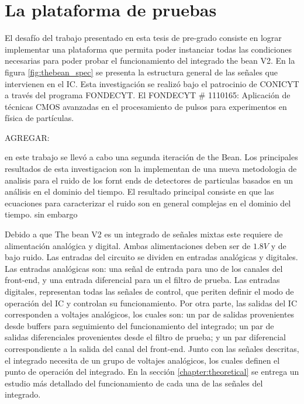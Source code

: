 \section{La plataforma de pruebas}
El desafío del trabajo presentado en esta tesis de pre-grado consiste en lograr implementar una plataforma que permita poder instanciar todas las condiciones necesarias para poder probar el funcionamiento del integrado the bean V2. En la figura \ref{fig:thebean_spec} se presenta la estructura general de las señales que intervienen en el IC.
Esta investigación se realizó bajo el patrocinio de CONICYT a través del programa FONDECYT.
El FONDECYT  \# 1110165: Aplicación de técnicas CMOS avanzadas en el procesamiento de pulsos para experimentos en física de partículas.

AGREGAR:

en este trabajo se llevó a cabo una segunda iteración de the Bean. Los principales resultados de esta investigacion son la implementan de una nueva metodologia de analisis para el ruido de los fornt ends de detectores de particulas basados en un análisis en el dominio del tiempo. El resultado principal consiste en que las ecuaciones para caracterizar el ruido son en general complejas en el dominio del tiempo. sin embargo 





Debido a que The bean V2 es un integrado de señales mixtas este requiere de alimentación analógica y digital. Ambas alimentaciones deben ser de $1.8V$ y de bajo ruido. Las entradas del circuito se dividen en entradas analógicas y digitales. Las entradas analógicas son: una señal de entrada para uno de los canales del front-end, y una entrada diferencial para un el filtro de prueba.  Las entradas digitales, representan todas las señales de control, que periten definir el modo de operación del IC y controlan su funcionamiento. Por otra parte, las salidas del IC corresponden a voltajes analógicos, los cuales son: un par de salidas provenientes desde buffers para seguimiento del funcionamiento del integrado; un par de salidas diferenciales provenientes desde el filtro de prueba; y un par diferencial correspondiente a la salida del canal del front-end. Junto con las señales descritas, el integrado necesita de un grupo de voltajes analógicos, los cuales definen el punto de operación del integrado. En la sección \ref{chapter:theoretical} se entrega un estudio más detallado del funcionamiento de cada una de las señales del integrado. 

